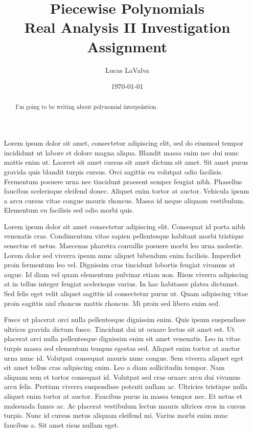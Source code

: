 \documentclass[12pt]{article}
\title{Piecewise Polynomials \\
    {\large Real Analysis II Investigation Assignment}}
\author{Lucas LaValva}
\date{\today}
\begin{document}
\maketitle

\begin{abstract}
    I'm going to be writing about polynomial interpolation. \cite{enwiki:polynomial_interpolation}
\end{abstract}

\begin{multicols*}{2}
    Lorem ipsum dolor sit amet, consectetur adipiscing elit, sed do eiusmod tempor incididunt ut labore et dolore magna aliqua. Blandit massa enim nec dui nunc mattis enim ut. Laoreet sit amet cursus sit amet dictum sit amet. Sit amet purus gravida quis blandit turpis cursus. Orci sagittis eu volutpat odio facilisis. Fermentum posuere urna nec tincidunt praesent semper feugiat nibh. Phasellus faucibus scelerisque eleifend donec. Aliquet enim tortor at auctor. Vehicula ipsum a arcu cursus vitae congue mauris rhoncus. Massa id neque aliquam vestibulum. Elementum eu facilisis sed odio morbi quis.

    Lorem ipsum dolor sit amet consectetur adipiscing elit. Consequat id porta nibh venenatis cras. Condimentum vitae sapien pellentesque habitant morbi tristique senectus et netus. Maecenas pharetra convallis posuere morbi leo urna molestie. Lorem dolor sed viverra ipsum nunc aliquet bibendum enim facilisis. Imperdiet proin fermentum leo vel. Dignissim cras tincidunt lobortis feugiat vivamus at augue. Id diam vel quam elementum pulvinar etiam non. Risus viverra adipiscing at in tellus integer feugiat scelerisque varius. In hac habitasse platea dictumst. Sed felis eget velit aliquet sagittis id consectetur purus ut. Quam adipiscing vitae proin sagittis nisl rhoncus mattis rhoncus. Mi proin sed libero enim sed.

    Fusce ut placerat orci nulla pellentesque dignissim enim. Quis ipsum suspendisse ultrices gravida dictum fusce. Tincidunt dui ut ornare lectus sit amet est. Ut placerat orci nulla pellentesque dignissim enim sit amet venenatis. Leo in vitae turpis massa sed elementum tempus egestas sed. Aliquet enim tortor at auctor urna nunc id. Volutpat consequat mauris nunc congue. Sem viverra aliquet eget sit amet tellus cras adipiscing enim. Leo a diam sollicitudin tempor. Nam aliquam sem et tortor consequat id. Volutpat sed cras ornare arcu dui vivamus arcu felis. Pretium viverra suspendisse potenti nullam ac. Ultricies tristique nulla aliquet enim tortor at auctor. Faucibus purus in massa tempor nec. Et netus et malesuada fames ac. Ac placerat vestibulum lectus mauris ultrices eros in cursus turpis. Nunc id cursus metus aliquam eleifend mi. Varius morbi enim nunc faucibus a. Sit amet risus nullam eget.


\end{multicols*}
\end{document}
